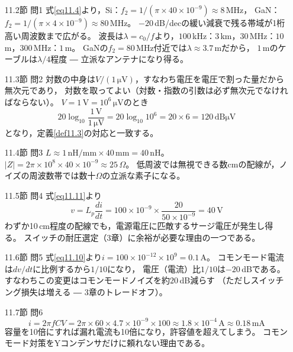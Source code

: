 \answer
\begin{enumerate}

\item[11.2節 問1]
式\ref{eq11.4}より，Si：$f_2 = 1/(\pi \times 40\times10^{-9}) \approx 8$\,MHz，
GaN：$f_2 = 1/(\pi \times 4\times10^{-9}) \approx 80$\,MHz。
$-20$\,dB/decの緩い減衰で残る帯域が1桁高い周波数まで広がる。
波長は$\lambda = c_0/f$より，$100$\,kHz：$3$\,km，$30$\,MHz：$10$\,m，$300$\,MHz：$1$\,m。
GaNの$f_2 = 80$\,MHz付近では$\lambda \approx 3.7$\,mだから，
$1$\,mのケーブルは$\lambda/4$程度 ― 立派なアンテナになり得る。

\item[11.3節 問2]
対数の中身は$V/(1\,\mathrm{\mu V})$，すなわち電圧を電圧で割った量だから無次元であり，
対数を取ってよい（対数・指数の引数は必ず無次元でなければならない）。
$V = 1\,\mathrm{V} = 10^6\,\mathrm{\mu V}$のとき
\begin{equation*}
20 \log_{10} \frac{1\,\mathrm{V}}{1\,\mathrm{\mu V}} = 20 \log_{10} 10^6 = 20 \times 6
= 120\,\mathrm{dB\mu V}
\end{equation*}
となり，定義\ref{def11.3}の対応と一致する。

\item[11.4節 問3]
$L \approx 1\,\mathrm{nH/mm} \times 40\,\mathrm{mm} = 40$\,nH。
$|Z| = 2\pi \times 10^8 \times 40\times10^{-9} \approx 25\,\Omega$。
低周波では無視できる数cmの配線が，ノイズの周波数帯では数十$\Omega$の立派な素子になる。

\item[11.5節 問4]
式\ref{eq11.11}より
\begin{equation*}
v = L_p \frac{di}{dt} = 100\times10^{-9} \times \frac{20}{50\times10^{-9}} = 40\,\mathrm{V}
\end{equation*}
わずか10\,cm程度の配線でも，電源電圧に匹敵するサージ電圧が発生し得る。
スイッチの耐圧選定（3章）に余裕が必要な理由の一つである。

\item[11.6節 問5]
式\ref{eq11.10}より$i = 100\times10^{-12} \times 10^9 = 0.1$\,A。
コモンモード電流は$dv/dt$に比例するから$1/10$になり，
電圧（電流）比$1/10$は$-20$\,dBである。
すなわちこの変更はコモンモードノイズを約$20$\,dB減らす
（ただしスイッチング損失は増える ― 3章のトレードオフ）。

\item[11.7節 問6]
\begin{equation*}
i = 2\pi f C V = 2\pi \times 60 \times 4.7\times10^{-9} \times 100
\approx 1.8\times10^{-4}\,\mathrm{A} \approx 0.18\,\mathrm{mA}
\end{equation*}
容量を10倍にすれば漏れ電流も10倍になり，許容値を超えてしまう。
コモンモード対策をYコンデンサだけに頼れない理由である。
\end{enumerate}
